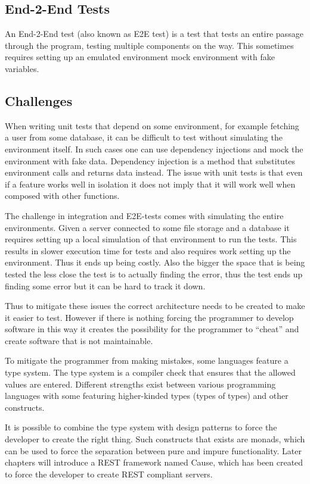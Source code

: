 \subsection{End-2-End Tests}

An End-2-End test (also known as E2E test) is a test that tests an entire
passage through the program, testing multiple components on the way. This
sometimes requires setting up an emulated environment mock environment with fake
variables.

\subsection{Challenges}

When writing unit tests that depend on some environment, for example fetching a
user from some database, it can be difficult to test without simulating the
environment itself. In such cases one can use dependency injections and mock the
environment with fake data. Dependency injection is a method that substitutes
environment calls and returns data instead. The issue with unit tests is that
even if a feature works well in isolation it does not imply that it will work
well when composed with other functions.

The challenge in integration and E2E-tests comes with simulating the entire
environments. Given a server connected to some file storage and a database it
requires setting up a local simulation of that environment to run the tests.
This results in slower execution time for tests and also requires work setting
up the environment. Thus it ends up being costly. Also the bigger the space
that is being tested the less close the test is to actually finding the error,
thus the test ends up finding some error but it can be hard to track it down.

Thus to mitigate these issues the correct architecture needs to be created to
make it easier to test. However if there is nothing forcing the programmer to
develop software in this way it creates the possibility for the programmer to
``cheat'' and create software that is not maintainable. 

To mitigate the programmer from making mistakes, some languages feature a type
system. The type system is a compiler check that ensures that the allowed values
are entered. Different strengths exist between various programming languages
with some featuring higher-kinded types (types of types) and other constructs.

It is possible to combine the type system with design patterns to force the
developer to create the right thing. Such constructs that exists are monads,
which can be used to force the separation between pure and impure functionality.
Later chapters will introduce a REST framework named Cause, which has been
created to force the developer to create REST compliant servers. 

